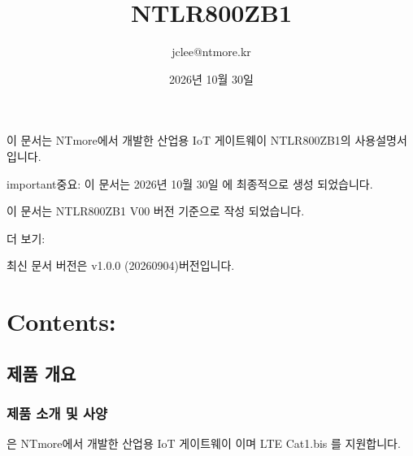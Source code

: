 \documentclass[letterpaper,10pt,english]{sphinxmanual}
\title{NTLR800Z\sphinxhyphen{}B1}
\date{2026년 10월 30일}
\author{jclee@ntmore.kr}
\begin{document}
\pagestyle{empty}
\sphinxmaketitle
\pagestyle{plain}
\sphinxtableofcontents
\pagestyle{normal}
\label{\detokenize{index::doc}}


\sphinxAtStartPar
이 문서는 NTmore에서 개발한 산업용 IoT 게이트웨이 NTLR800Z\sphinxhyphen{}B1의 사용설명서입니다.

\begin{sphinxadmonition}{important}{중요:}
\sphinxAtStartPar
이 문서는 2026년 10월 30일 에 최종적으로 생성 되었습니다.

\sphinxAtStartPar
이 문서는 NTLR800Z\sphinxhyphen{}B1 V00 버전 기준으로 작성 되었습니다.
\end{sphinxadmonition}


\begin{sphinxseealso}{더 보기:}

\sphinxAtStartPar
최신 문서 버전은 v1.0.0 (2026\sphinxhyphen{}09\sphinxhyphen{}04)버전입니다.


\end{sphinxseealso}



\chapter{Contents:}
\label{\detokenize{index:contents}}
\sphinxstepscope


\section{제품 개요}
\label{\detokenize{howto/overview:id1}}\label{\detokenize{howto/overview::doc}}

\subsection{제품 소개 및 사양}
\label{\detokenize{howto/overview:id2}}
\sphinxAtStartPar
{} 은 NTmore에서 개발한 산업용 IoT 게이트웨이 이며 LTE Cat1.bis 를 지원합니다.
\end{document}
